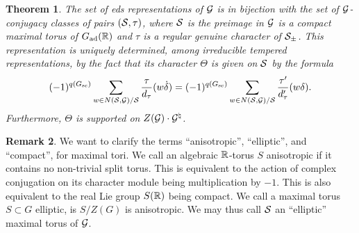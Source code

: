 \documentclass{article}
\newtheorem{thm}{Theorem}[subsection]
\theoremstyle{definition}
\newtheorem{rem}[thm]{Remark}
\numberwithin{equation}{section}
\renewcommand{\-}{\hyp{}}
\begin{document}
\begin{thm} \label{thm:eds}
The set of eds representations of $\mathcal{G}$ is in bijection with the set of $\mathcal{G}$-conjugacy classes of pairs $(\mathcal{S},\tau)$, where $\mathcal{S}$ is the preimage in $\mathcal{G}$ is a compact maximal torus of $G_{\textrm{ad}}(\mathbb{R})$ and $\tau$ is a regular genuine character of $\mathcal{S}_\pm$. This representation is uniquely determined, among irreducible tempered representations, by the fact that its character $\Theta$ is given on $\mathcal{S}$ by the formula
\begin{equation} \label{eq:charfmla}
		(-1)^{q(G_{\textrm{sc}})}\sum_{w \in N(\mathcal{S},\mathcal{G})/\mathcal{S}} \frac{\tau}{d_\tau}(w\dot\delta) = (-1)^{q(G_{\textrm{sc}})}\sum_{w \in N(\mathcal{S},\mathcal{G})/\mathcal{S}} \frac{\tau'}{d'_\tau}(w\delta).
\end{equation}
Furthermore, $\Theta$ is supported on $Z(\mathcal{G})\cdot \mathcal{G}^\natural$.
\end{thm}

\begin{rem}
	We want to clarify the terms ``anisotropic'', ``elliptic'', and ``compact'', for maximal tori. We call an algebraic $\mathbb{R}$-torus $S$ anisotropic if it contains no non-trivial split torus. This is equivalent to the action of complex conjugation on its character module being multiplication by $-1$. This is also equivalent to the real Lie group $S(\mathbb{R})$ being compact. We call a maximal torus $S \subset G$ elliptic, is $S/Z(G)$ is anisotropic. We may thus call $\mathcal{S}$ an ``elliptic'' maximal torus of $\mathcal{G}$.
\end{rem}
\end{document}
